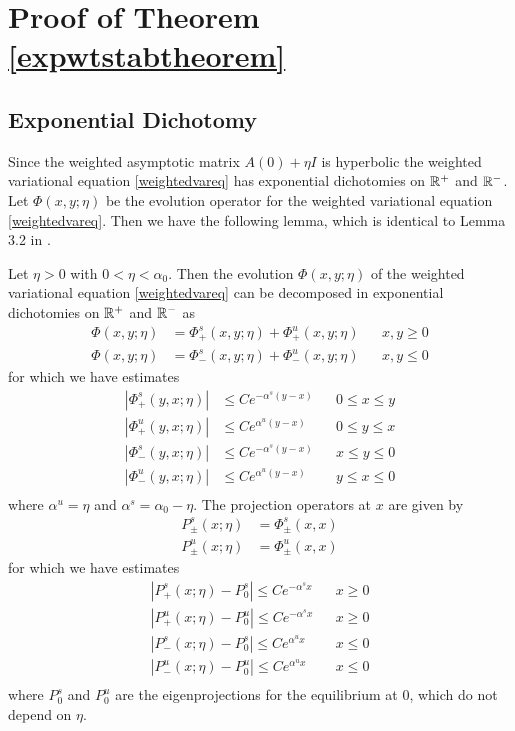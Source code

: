 \documentclass[thesis.tex]{subfiles}
\begin{document}
\section{Proof of Theorem \ref{expwtstabtheorem}}

\subsection{Exponential Dichotomy}

Since the weighted asymptotic matrix $A(0) + \eta I$ is hyperbolic the weighted variational equation \cref{weightedvareq} has exponential dichotomies on $\mathbb{R}^+$ and $\mathbb{R}^-$. Let $\Phi(x, y; \eta)$ be the evolution operator for the weighted variational equation \cref{weightedvareq}. Then we have the following lemma, which is identical to Lemma 3.2 in \cite{Sandstede1998}.


\begin{lemma}\label{weighteddichotomylemma}
Let $\eta > 0$ with $0 < \eta < \alpha_0$. Then the evolution $\Phi(x, y; \eta)$ of the weighted variational equation \cref{weightedvareq} can be decomposed in exponential dichotomies on $\mathbb{R}^+$ and $\mathbb{R}^-$ as
\begin{align*}
\Phi(x, y; \eta) &= \Phi^s_+(x, y; \eta) + \Phi^u_+(x, y; \eta) && x, y \geq 0 \\
\Phi(x, y; \eta) &= \Phi^s_-(x, y; \eta) + \Phi^u_-(x, y; \eta) && x, y \leq 0 
\end{align*}
for which we have estimates
\begin{align*}
|\Phi^s_+(y,x; \eta)| &\leq Ce^{-\alpha^s(y-x)} && 0 \leq x \leq y \\
|\Phi^u_+(y,x; \eta)| &\leq Ce^{\alpha^u(y-x)}  && 0 \leq y \leq x \\
|\Phi^s_-(y,x; \eta)| &\leq Ce^{-\alpha^s(y-x)} && x \leq y \leq 0 \\
|\Phi^u_-(y,x; \eta)| &\leq Ce^{\alpha^u(y-x)}  && y \leq x \leq 0 \\
\end{align*}
where $\alpha^u = \eta$ and $\alpha^s = \alpha_0 - \eta$. The projection operators at $x$ are given by
\begin{align*}
P^s_\pm(x; \eta) &= \Phi^s_\pm(x,x)\\
P^u_\pm(x; \eta) &= \Phi^u_\pm(x,x)
\end{align*}
for which we have estimates
\begin{equation}\label{weightedprojest}
\begin{aligned}
|P^s_+(x; \eta) - P_0^s| \leq Ce^{-\alpha^s x} && x \geq 0 \\
|P^u_+(x; \eta) - P_0^u| \leq Ce^{-\alpha^s x} && x \geq 0 \\
|P^s_-(x; \eta) - P_0^s| \leq Ce^{\alpha^u x} && x \leq 0 \\
|P^u_-(x; \eta) - P_0^u| \leq Ce^{\alpha^u x} && x \leq 0 \\
\end{aligned}
\end{equation}
where $P_0^s$ and $P_0^u$ are the eigenprojections for the equilibrium at 0, which do not depend on $\eta$.
\end{lemma}
\end{document}
